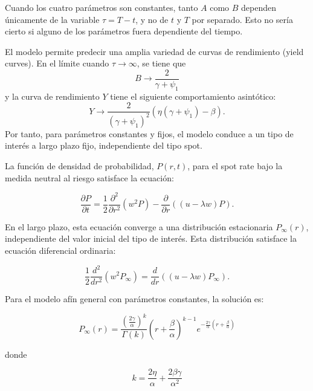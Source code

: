 Cuando los cuatro parámetros son constantes, tanto $A$ como $B$ dependen únicamente de la variable $\tau = T-t$, y no de $t$ y $T$ por separado. Esto no sería cierto si alguno de los parámetros fuera dependiente del tiempo.

El modelo permite predecir una amplia variedad de curvas de rendimiento (yield curves). En el límite cuando $\tau \to \infty$, se tiene que
\begin{equation*}
    B \to \frac{2}{\gamma + \psi_1}
\end{equation*}
y la curva de rendimiento $Y$ tiene el siguiente comportamiento asintótico:
\begin{equation*}
    Y \to \frac{2}{(\gamma + \psi_1)^2} \left( \eta (\gamma + \psi_1) - \beta \right).
\end{equation*}
Por tanto, para parámetros constantes y fijos, el modelo conduce a un tipo de interés a largo plazo fijo, independiente del tipo spot.

La función de densidad de probabilidad, $P(r, t)$, para el spot rate bajo la medida neutral al riesgo satisface la ecuación:

\begin{equation*}
    \frac{\partial P}{\partial t} = \frac{1}{2} \frac{\partial^2}{\partial r^2} (w^2 P) - \frac{\partial}{\partial r} \left( (u - \lambda w) P \right).
\end{equation*}

En el largo plazo, esta ecuación converge a una distribución estacionaria $P_\infty(r)$, independiente del valor inicial del tipo de interés. Esta distribución satisface la ecuación diferencial ordinaria:

\begin{equation*}
    \frac{1}{2} \frac{d^2}{dr^2} (w^2 P_\infty) = \frac{d}{dr} \left( (u - \lambda w) P_\infty \right).
\end{equation*}

Para el modelo afín general con parámetros constantes, la solución es:

\begin{equation*}
    \boxed{P_\infty(r) = \frac{\left( \frac{2\gamma}{\alpha} \right)^k}{\Gamma(k)} \left( r + \frac{\beta}{\alpha} \right)^{k-1} e^{-\frac{2\gamma}{\alpha} \left( r + \frac{\beta}{\alpha} \right)}}
\end{equation*}

donde

\begin{equation*}
    k = \frac{2\eta}{\alpha} + \frac{2\beta\gamma}{\alpha^2}
\end{equation*}

